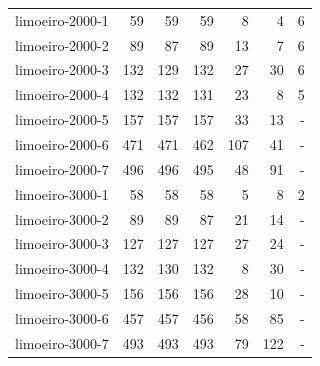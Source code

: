 \begin{table}[ht!]
{\begin{tabular}{lrrrrrr}
			limoeiro-2000-1                                                                         & 59  & 59  & 59  & 8   & 4   & 6   \\
			limoeiro-2000-2                                                                         & 89  & 87  & 89  & 13  & 7   & 6   \\
			limoeiro-2000-3                                                                         & 132 & 129 & 132 & 27  & 30  & 6   \\
			limoeiro-2000-4                                                                         & 132 & 132 & 131 & 23  & 8   & 5   \\
			limoeiro-2000-5                                                                         & 157 & 157 & 157 & 33  & 13  & -   \\
			limoeiro-2000-6                                                                         & 471 & 471 & 462 & 107 & 41  & -   \\
			limoeiro-2000-7                                                                         & 496 & 496 & 495 & 48  & 91  & -   \\
			limoeiro-3000-1                                                                         & 58  & 58  & 58  & 5   & 8   & 2   \\
			limoeiro-3000-2                                                                         & 89  & 89  & 87  & 21  & 14  & -   \\
			limoeiro-3000-3                                                                         & 127 & 127 & 127 & 27  & 24  & -   \\
			limoeiro-3000-4                                                                         & 132 & 130 & 132 & 8   & 30  & -   \\
			limoeiro-3000-5                                                                         & 156 & 156 & 156 & 28  & 10  & -   \\
			limoeiro-3000-6                                                                         & 457 & 457 & 456 & 58  & 85  & -   \\
			limoeiro-3000-7                                                                         & 493 & 493 & 493 & 79  & 122 & -   \\
			\bottomrule
		\end{tabular}%
	}
\end{table}

